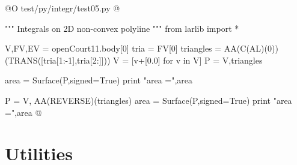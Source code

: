 \documentclass[11pt,oneside]{article}	%
\begin{document}
@O test/py/integr/test05.py
@{""" Integrals on 2D non-convex polyline """
from larlib import *

V,FV,EV = openCourt11.body[0]
tria = FV[0]
triangles = AA(C(AL)(0))(TRANS([tria[1:-1],tria[2:]]))
V = [v+[0.0] for v in V]
P = V,triangles

area = Surface(P,signed=True)
print "area =",area

P = V, AA(REVERSE)(triangles)
area = Surface(P,signed=True)
print "area =",area
@}

   

\appendix
\section{Utilities}





\end{document}
